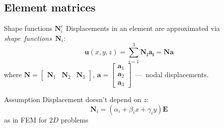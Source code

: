 \documentclass[10pt]{beamer}
\newcommand{\aM}{\mathbf{a}}
\newcommand{\NM}{\mathbf{N}}
\numberwithin{equation}{subsection}
\begin{document}
\subsection{Element matrices}

\begin{frame}{Shape functions $\mathbf{N}_i^e$}
    Displacements in an element are approximated via \emph{shape~functions}~$\NM_i$:
    \begin{equation}\label{shape}
		\mathbf{u}(x,y,z) = \sum_{i = 1}^3{\mathbf{N_ia_i}} = \mathbf{Na}
	\end{equation}
	where $\NM = \left[ \begin{smallmatrix} \NM_1 & \NM_2 & \NM_3
	                                        \end{smallmatrix} \right]$, 
		$\aM = \left[ \begin{smallmatrix} \aM_1 \\ \aM_2 \\ \aM_3
		                \end{smallmatrix} \right]$~---~nodal displacements.
    \begin{alertblock}{Assumption}
    Displacement doesn't depend on $z$:
        \begin{equation}
			\NM_i = (\alpha_i + \beta_i x + \gamma_i y)\mathbf{E}
		\end{equation}
	as in FEM for $2D$ problems\cite{zie00}
    \end{alertblock}
\end{frame}
\end{document}
